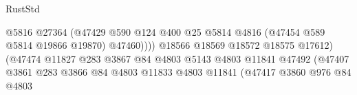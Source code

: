\begin{lexlean}{RustStd}
\begin{coremodule}
                                                              @5816
                                                              @27364
                                                              (@47429
                                                                @590
                                                                @124
                                                                @400
                                                                @25
                                                                @5814
                                                                @4816
                                                                (@47454 @589 @5814 @19866 @19870)
                                                                @47460))))
                                                        @18566
                                                        @18569
                                                        @18572
                                                        @18575
                                                        @17612)
                                                      (@47474
                                                        @11827
                                                        @283
                                                        @3867
                                                        @84
                                                        @4803
                                                        @5143
                                                        @4803
                                                        @11841
                                                        @47492
                                                        (@47407
                                                          @3861
                                                          @283
                                                          @3866
                                                          @84
                                                          @4803
                                                          @11833
                                                          @4803
                                                          @11841
                                                          (@47417
                                                            @3860
                                                            @976
                                                            @84
                                                            @4803

\end{coremodule}
\end{lexlean}
